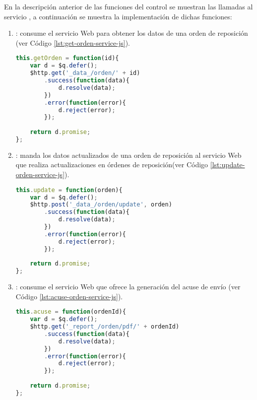 En la descripción anterior de las funciones del control  se muestran las llamadas al servicio , a continuación se muestra la implementación de dichas funciones:

\begin{enumerate}
	\item {}: consume el servicio Web para obtener los datos de una orden de reposición (ver Código \ref{lst:get-orden-service-js}).
\begin{lstlisting}[language=Javascript, caption={Función para consumir el servicio Web que obtiene los datos de una orden de reposición.}, captionpos=b, label={lst:get-orden-service-js}]
this.getOrden = function(id){
	var d = $q.defer();
	$http.get('_data_/orden/' + id)
		.success(function(data){
			d.resolve(data);
		})
		.error(function(error){
			d.reject(error);
		});
	
	return d.promise;
};
\end{lstlisting}

	\item {}: manda los datos actualizados de una orden de reposición al servicio Web que realiza actualizaciones en órdenes de reposición(ver Código \ref{lst:update-orden-service-js}).
\begin{lstlisting}[language=Javascript, caption={Función para actualizar los datos de una orden de reposición}, captionpos=b, label={lst:update-orden-service-js}]
this.update = function(orden){
	var d = $q.defer();
	$http.post('_data_/orden/update', orden)
		.success(function(data){
			d.resolve(data);
		})
		.error(function(error){
			d.reject(error);
		});
	
	return d.promise;
};
\end{lstlisting}

	\item {}: consume el servicio Web que ofrece la generación del acuse de envío (ver Código \ref{lst:acuse-orden-service-js}).
\begin{lstlisting}[language=Javascript, caption={Función para mandar la generación del acuse de envío de una orden de reposición.}, captionpos=b, label={lst:acuse-orden-service-js}]
this.acuse = function(ordenId){
	var d = $q.defer();
	$http.get('_report_/orden/pdf/' + ordenId)
		.success(function(data){
			d.resolve(data);
		})
		.error(function(error){
			d.reject(error);
		});
	
	return d.promise;
};
\end{lstlisting}

\end{enumerate}

